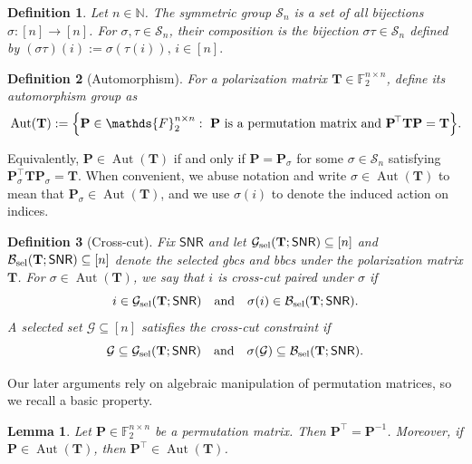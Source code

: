 \documentclass[onecolumn]{IEEEtran} %
\newcommand{\bP}{\mathbf P}
\newcommand{\1}{\mathbbm{1}}
\DeclareMathOperator{\Aut}{Aut}
\theoremstyle{boldremark}
\newtheorem{lemma}{Lemma}
\newtheorem{definition}{Definition}
\newcommand{\bT}{\mathbf{T}}
\begin{document}
\begin{definition}\label{def:symmetric-group}
Let \(n\in\mathbb N\). The \emph{symmetric group} \(\mathcal{S}_n\) is a set of all bijections
\(\sigma:[n]\to[n]\).
For \(\sigma,\tau\in\mathcal{S}_n\), their composition is the bijection
\(\sigma\tau\in\mathcal{S}_n\) defined by $(\sigma\tau)(i):=\sigma(\tau(i)),\, i\in[n].$
\end{definition}

\begin{definition}[Automorphism]\label{Def_Aut}
For a polarization matrix $\mathbf{T}\in\mathds{F}_2^{n\times n}$, define its automorphism group as
\[
\Aut(\mathbf{T})
:=\Bigl\{\mathbf{P}\in\mathds{F}_2^{n\times n}:\ \mathbf{P}\ \text{is a permutation matrix and}\ \mathbf{P}^{\!\top}\mathbf{T}\mathbf{P}=\mathbf{T}\Bigr\}.
\]
\end{definition}
Equivalently, $\mathbf{P}\in\Aut(\mathbf{T})$ if and only if $\mathbf{P}=\mathbf{P}_\sigma$ for some $\sigma\in\mathcal S_n$ satisfying $\mathbf{P}_{\sigma}^{\!\top}\mathbf{T}\mathbf{P}_{\sigma}=\mathbf{T}$.
When convenient, we abuse notation and write $\sigma\in\Aut(\mathbf T)$ to mean that
$\mathbf P_\sigma\in\Aut(\mathbf T)$, and we use $\sigma(i)$ to denote the induced action on indices.

\begin{definition}[Cross-cut]\label{def:cross-cut}
Fix $\textsf{SNR}$ and let
$\mathcal{G}_{\rm sel}(\bT;\textsf{SNR})\subseteq[n]$ and
$\mathcal{B}_{\rm sel}(\bT;\textsf{SNR})\subseteq[n]$
denote the selected \gls{gbcs} and \gls{bbcs} under the polarization matrix $\bT$. For $\sigma\in\Aut(\bT)$, we say that \emph{$i$ is cross-cut paired under $\sigma$}
if
\[
i\in\mathcal{G}_{\rm sel}(\bT;\textsf{SNR})
\quad\text{and}\quad
\sigma(i)\in\mathcal{B}_{\rm sel}(\bT;\textsf{SNR}).
\]
A selected set $\mathcal{G}\subseteq[n]$ satisfies the \emph{cross-cut constraint} if
\[
\mathcal{G}\subseteq\mathcal{G}_{\rm sel}(\bT;\textsf{SNR})
\quad\text{and}\quad
\sigma(\mathcal{G})\subseteq\mathcal{B}_{\rm sel}(\bT;\textsf{SNR}).
\]
\end{definition}

Our later arguments rely on algebraic manipulation of permutation matrices, so we
recall a basic property.

\begin{lemma}\label{lem:aut-inverse}
Let $\bP\in\mathds{F}_2^{n\times n}$ be a permutation matrix. Then $\bP^\top=\bP^{-1}$.
Moreover, if $\bP\in\Aut(\bT)$, then $\bP^\top\in\Aut(\bT)$.
\end{lemma}
\end{document}
